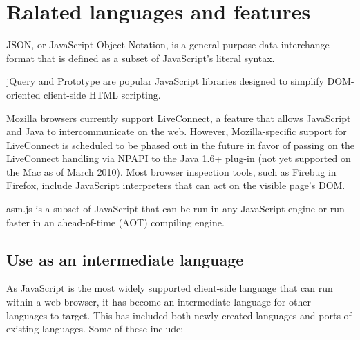 


\chapter{Ralated languages and features}




JSON, or JavaScript Object Notation, is a general-purpose data interchange format that is defined as a subset of JavaScript's literal syntax.


jQuery and Prototype are popular JavaScript libraries designed to simplify DOM-oriented client-side HTML scripting.


Mozilla browsers currently support LiveConnect, a feature that allows JavaScript and Java to intercommunicate on the web. However, Mozilla-specific support for LiveConnect is scheduled to be phased out in the future in favor of passing on the LiveConnect handling via NPAPI to the Java 1.6+ plug-in (not yet supported on the Mac as of March 2010). Most browser inspection tools, such as Firebug in Firefox, include JavaScript interpreters that can act on the visible page's DOM.

asm.js is a subset of JavaScript that can be run in any JavaScript engine or run faster in an ahead-of-time (AOT) compiling engine.

\section{Use as an intermediate language}





As JavaScript is the most widely supported client-side language that can run within a web browser, it has become an intermediate language for other languages to target. This has included both newly created languages and ports of existing languages. Some of these include:



